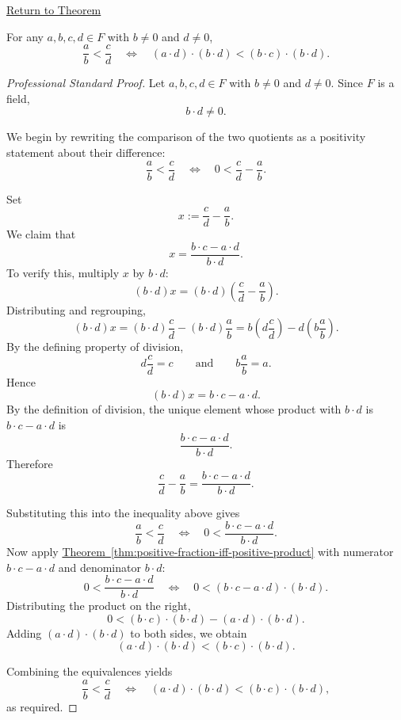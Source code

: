 \newpage
{}
\label{prf:fraction-order-comparison-general}

\begin{remark*}[Return]
\hyperref[thm:fraction-order-comparison-general]{Return to Theorem}
\end{remark*}

\begin{theorem*}
For any $a,b,c,d\in F$ with $b\neq 0$ and $d\neq 0$,
\[
\frac{a}{b}<\frac{c}{d}
\quad\Longleftrightarrow\quad
(a\cdot d)\cdot(b\cdot d)<(b\cdot c)\cdot(b\cdot d).
\]
\end{theorem*}

\begin{proof}[Professional Standard Proof]
\LRAProofBodyStart
Let $a,b,c,d\in F$ with $b\neq 0$ and $d\neq 0$.  Since $F$ is a field,
\[
b\cdot d\neq 0.
\]

We begin by rewriting the comparison of the two quotients as a positivity
statement about their difference:
\[
\frac{a}{b}<\frac{c}{d}
\quad\Longleftrightarrow\quad
0<\frac{c}{d}-\frac{a}{b}.
\]

Set
\[
x:=\frac{c}{d}-\frac{a}{b}.
\]
We claim that
\[
x=\frac{b\cdot c-a\cdot d}{b\cdot d}.
\]
To verify this, multiply $x$ by $b\cdot d$:
\[
(b\cdot d)x
=(b\cdot d)\left(\frac{c}{d}-\frac{a}{b}\right).
\]
Distributing and regrouping,
\[
(b\cdot d)x
=(b\cdot d)\frac{c}{d}-(b\cdot d)\frac{a}{b}
=b\left(d\frac{c}{d}\right)-d\left(b\frac{a}{b}\right).
\]
By the defining property of division,
\[
d\frac{c}{d}=c
\qquad\text{and}\qquad
b\frac{a}{b}=a.
\]
Hence
\[
(b\cdot d)x=b\cdot c-a\cdot d.
\]
By the definition of division, the unique element whose product with
$b\cdot d$ is $b\cdot c-a\cdot d$ is
\[
\frac{b\cdot c-a\cdot d}{b\cdot d}.
\]
Therefore
\[
\frac{c}{d}-\frac{a}{b}=\frac{b\cdot c-a\cdot d}{b\cdot d}.
\]

Substituting this into the inequality above gives
\[
\frac{a}{b}<\frac{c}{d}
\quad\Longleftrightarrow\quad
0<\frac{b\cdot c-a\cdot d}{b\cdot d}.
\]
Now apply
\hyperref[thm:positive-fraction-iff-positive-product]{Theorem~\ref*{thm:positive-fraction-iff-positive-product}}
with numerator $b\cdot c-a\cdot d$ and denominator $b\cdot d$:
\[
0<\frac{b\cdot c-a\cdot d}{b\cdot d}
\quad\Longleftrightarrow\quad
0<(b\cdot c-a\cdot d)\cdot(b\cdot d).
\]
Distributing the product on the right,
\[
0<(b\cdot c)\cdot(b\cdot d)-(a\cdot d)\cdot(b\cdot d).
\]
Adding $(a\cdot d)\cdot(b\cdot d)$ to both sides, we obtain
\[
(a\cdot d)\cdot(b\cdot d)<(b\cdot c)\cdot(b\cdot d).
\]

Combining the equivalences yields
\[
\frac{a}{b}<\frac{c}{d}
\quad\Longleftrightarrow\quad
(a\cdot d)\cdot(b\cdot d)<(b\cdot c)\cdot(b\cdot d),
\]
as required.
\end{proof}

